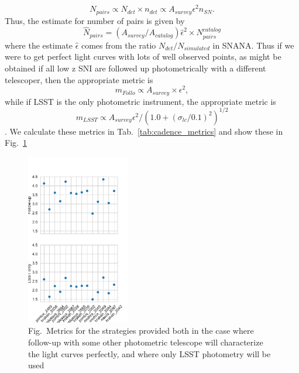     $$
    N_{pairs} \propto N_{det} \times {n_{det}} \propto A_{survey} \epsilon^2 {n_{SN}}.
    $$
Thus, the estimate for number of pairs is given by
$$
    \hat{N}_{pairs} = \left( A_{survey} / A_{catalog} \right)\hat{\epsilon}^2 \times N_{pairs}^{catalog}
    $$
where the estimate $\hat{\epsilon}$ comes from the ratio $N_{det}/ N_{simulated}$ in SNANA. Thus if we were to get perfect light curves with lots of well observed points, as might be obtained if all low z SNI are followed up photometrically with a different telescoper, then the appropriate metric is 
\begin{equation}
    m_{Follo} \propto A_{survey} \times \epsilon^2,
\end{equation}
while if LSST is the only photometric instrument, the appropriate metric is
\begin{equation}
    m_{LSST} \propto A_{survey} \epsilon^2 /(1.0 + \left(\sigma_{lc}/0.1\right)^2)^{1/2}
\end{equation}. We calculate these metrics in Tab.~\ref{tab:cadence_metrics} and show these in Fig.~\ref{fig:cadence_metrics}

\begin{figure}
    \begin{center}
        \includegraphics[width=0.4\textwidth]{figures/metrics}
        \caption{Fig.~Metrics for the strategies provided both in the case where follow-up with some other photometric telescope will characterize the light curves perfectly, and where only LSST photometry will be used}
    \label{fig:cadence_metrics}
    \end{center}
\end{figure}

